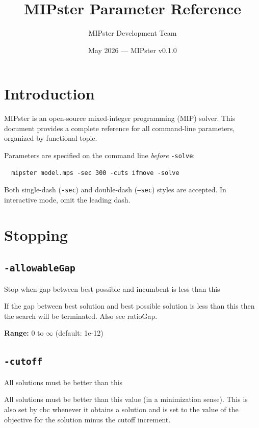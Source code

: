 \documentclass[11pt,a4paper]{article}
\title{MIPster Parameter Reference}
\author{MIPster Development Team}
\date{May 2026 --- MIPster v0.1.0}
\begin{document}
\maketitle
\tableofcontents
\newpage

\section*{Introduction}

MIPster is an open-source mixed-integer programming (MIP) solver.
This document provides a complete reference for all command-line
parameters, organized by functional topic.

Parameters are specified on the command line \emph{before} \texttt{-solve}:
\begin{verbatim}
  mipster model.mps -sec 300 -cuts ifmove -solve
\end{verbatim}

Both single-dash (\texttt{-sec}) and double-dash (\texttt{--sec}) styles
are accepted.  In interactive mode, omit the leading dash.

\section{Stopping}

\subsection*{\texttt{-allowableGap}}

Stop when gap between best possible and incumbent is less than this

If the gap between best solution and best possible solution is less than this then the search will be terminated. Also see ratioGap.

\textbf{Range:} 0 to $\infty$ (default: 1e-12)

\subsection*{\texttt{-cutoff}}

All solutions must be better than this

All solutions must be better than this value (in a minimization sense).  This is also set by cbc whenever it obtains a solution and is set to the value of the objective for the solution minus the cutoff increment.
\end{document}

